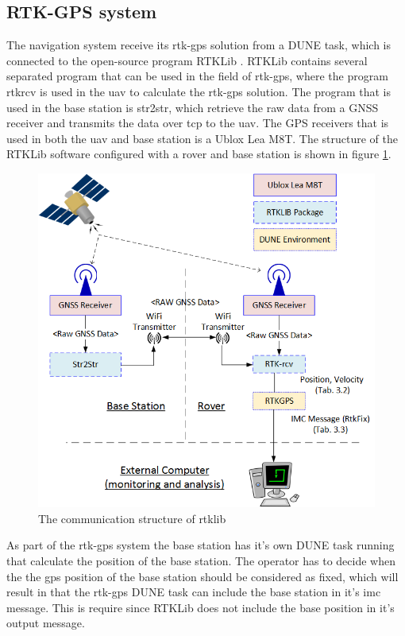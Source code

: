 \subsection{RTK-GPS system}
The navigation system receive its \gls{rtk-gps} solution from a DUNE task, which is connected to the open-source program RTKLib \citep{takasu2009development}. RTKLib contains several separated program that can be used in the field of \gls{rtk-gps}, where the program rtkrcv is used in the \gls{uav} to calculate the \gls{rtk-gps} solution. The program that is used in the base station is str2str, which retrieve the raw data from a GNSS receiver and transmits the data over tcp to the \gls{uav}. The GPS receivers that is used in both the \gls{uav} and base station is a Ublox Lea M8T. The structure of the RTKLib software configured with a rover and base station is shown in figure \ref{figure:RTKLIB_STRUCTURE}.
\clearpage
\begin{figure}[H]
	\centering
		\includegraphics[width=1\textwidth]{figs/RTKLIB.png}
		\caption{The communication structure of \gls{rtklib}}
		\label{figure:RTKLIB_STRUCTURE}
\end{figure}
\clearpage
As part of the \gls{rtk-gps} system the base station has it's own DUNE task running that calculate the position of the base station. The operator has to decide when the the \gls{gps} position of the base station should be considered as fixed, which will result in that the \gls{rtk-gps} DUNE task can include the base station in it's \gls{imc} message. This is require since RTKLib does not include the base position in it's output message. 
